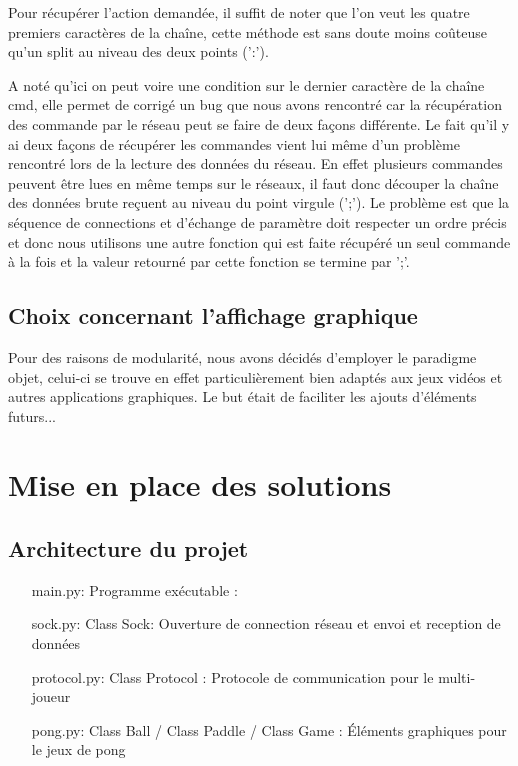 \documentclass[12pt]{report}
\begin{document}
Pour récupérer l'action demandée, il suffit de noter que l'on veut les quatre premiers
caractères de la chaîne, cette méthode est sans doute moins coûteuse qu'un split
au niveau des deux points (':').

A noté qu'ici on peut voire une condition sur le dernier caractère de la chaîne
cmd, elle permet de corrigé un bug que nous avons rencontré car la récupération
des commande par le réseau peut se faire de deux façons différente.
Le fait qu'il y ai deux façons de récupérer les commandes vient lui même d'un
problème rencontré lors de la lecture des données du réseau. En effet
plusieurs commandes peuvent être lues en même temps sur le réseaux, il faut
donc découper la chaîne des données brute reçuent au niveau du point virgule
(';').
Le problème est que la séquence de connections et d'échange de paramètre doit
respecter un ordre précis et donc nous utilisons une autre fonction qui est
faite récupéré un seul commande à la fois et la valeur retourné par cette
fonction se termine par ';'.

\chapter{Choix concernant l'affichage graphique} %
Pour des raisons de modularité, nous avons décidés d'employer le
paradigme objet, celui-ci se trouve en effet particulièrement bien
adaptés aux jeux vidéos et autres applications graphiques. Le but
était de faciliter les ajouts d'éléments futurs...

\part{Mise en place des solutions}
\chapter{Architecture du projet}
\begin{itemize}
\item[main.py: ] Programme exécutable : 
\item[sock.py: ] Class Sock: Ouverture de connection réseau et envoi
  et reception de données 
\item[protocol.py: ] Class Protocol : Protocole de communication pour le
  multi-joueur
\item[pong.py: ] Class Ball / Class Paddle / Class Game : Éléments graphiques
  pour le jeux de pong 
\end{itemize}
\end{document}
